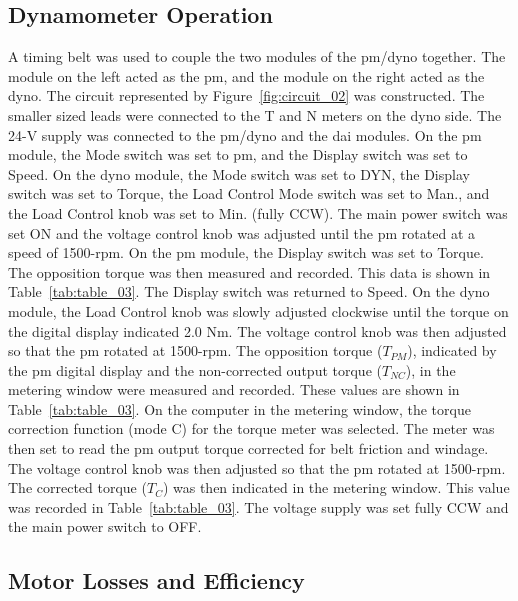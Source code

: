 \documentclass{article}
\begin{document}
\subsection{Dynamometer Operation}

\label{part2} A timing belt was used to couple the two modules of the
\gls{pm}/\gls{dyno} together. The module on the left acted as the \gls{pm}, and
the module on the right acted as the \gls{dyno}. The circuit represented by
Figure~\ref{fig:circuit_02} was constructed. The smaller sized leads were
connected to the T and N meters on the \gls{dyno} side. The 24-V supply was
connected to the \gls{pm}/\gls{dyno} and the \gls{dai} modules. On the \gls{pm}
module, the Mode switch was set to \gls{pm}, and the Display switch was set to
Speed. On the \gls{dyno} module, the Mode switch was set to DYN, the Display
switch was set to Torque, the Load Control Mode switch was set to Man., and the
Load Control knob was set to Min. (fully CCW). The main power switch was set ON
and the voltage control knob was adjusted until the \gls{pm} rotated at a speed
of 1500-rpm. On the \gls{pm} module, the Display switch was set to Torque.  The
opposition torque was then measured and recorded. This data is shown in
Table~\ref{tab:table_03}. The Display switch was returned to Speed. On the
\gls{dyno} module, the Load Control knob was slowly adjusted clockwise until
the torque on the digital display indicated 2.0 Nm. The voltage control knob
was then adjusted so that the \gls{pm} rotated at 1500-rpm. The opposition
torque ($T_{PM}$), indicated by the \gls{pm} digital display and the
non-corrected output torque ($T_{NC}$), in the metering window were measured
and recorded. These values are shown in Table~\ref{tab:table_03}. On the
computer in the metering window, the torque correction function (mode C) for
the torque meter was selected. The meter was then set to read the \gls{pm}
output torque corrected for belt friction and windage. The voltage control knob
was then adjusted so that the \gls{pm} rotated at 1500-rpm.  The corrected
torque ($T_C$) was then indicated in the metering window. This value was
recorded in Table~\ref{tab:table_03}. The voltage supply was set fully CCW and
the main power switch to OFF.

\subsection{Motor Losses and Efficiency}
\end{document}
